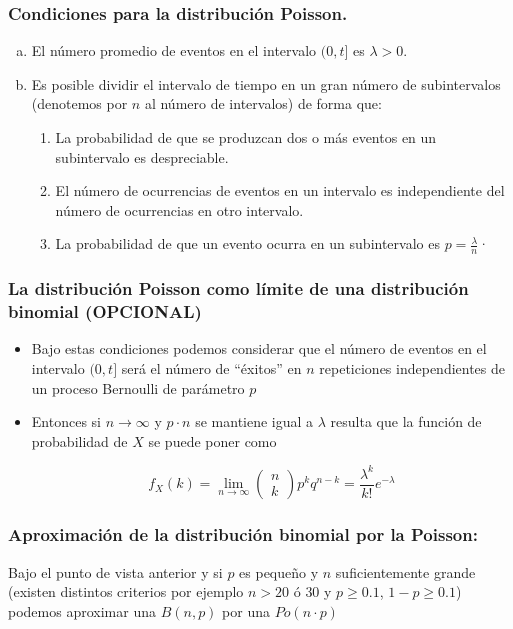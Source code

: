 \documentclass[handout]{beamer}\usepackage[]{graphicx}\usepackage[]{color}
\renewcommand{\emph}[1]{{\color{red}#1}}
\renewcommand{\geq}{\geqslant}
\theoremstyle{plain}
\theoremstyle{definition}
\begin{document}
\begin{frame}
\frametitle{Condiciones para la distribución Poisson.}
\begin{enumerate}[a)]
\item El número promedio de eventos en el intervalo $(0,t]$ es
$\lambda>0$.
\item Es posible dividir el intervalo de tiempo en un
gran número de subintervalos (denotemos por $n$ al número de intervalos) de forma que:
\begin{enumerate}[1)]
\item La probabilidad de que se produzcan dos o más eventos en un
subintervalo es despreciable.
\item El número de ocurrencias de eventos en un intervalo  es
independiente del número de ocurrencias en otro intervalo.
\item La probabilidad de que un evento ocurra en un subintervalo
es $p=\frac{\lambda}{n}$·
\end{enumerate}
\end{enumerate}
\end{frame}

\begin{frame}

\frametitle{La distribución Poisson como límite de una distribución binomial (\emph{OPCIONAL})}
\begin{itemize}
\item Bajo estas condiciones podemos considerar que el número de eventos en
el intervalo $(0,t]$ será el número de ``éxitos'' en $n$
repeticiones independientes de un proceso Bernoulli de parámetro
$p$
\item  Entonces si $n\to\infty$ y $p\cdot n$ se mantiene igual a $\lambda$
resulta que la función de probabilidad de $X$ se puede poner como

$$f_{X}(k)=\lim_{n\to\infty}\left(\begin{array}{c} n\\ k\end{array}\right)
p^k q^{n-k}= \frac{\lambda^k}{k!} e^{-\lambda}$$
\end{itemize}
\end{frame}


\begin{frame}
\frametitle{Aproximación de la distribución binomial por la Poisson:}
Bajo el punto de vista anterior y si $p$ es pequeño y $n$
suficientemente grande (existen distintos criterios por ejemplo $n>20$ ó $30$ y  $p\geq 0.1$, $1-p\geq 0.1$)
podemos aproximar una $B(n,p)$ por una $Po(n\cdot p)$
\end{frame}
\end{document}
